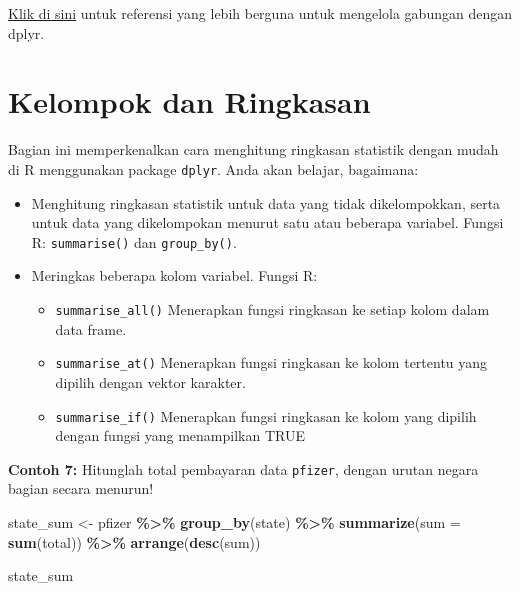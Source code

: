 \documentclass[
]{book}
\newenvironment{Shaded}{\begin{snugshade}}{\end{snugshade}}
\newcommand{\AttributeTok}[1]{\textcolor[rgb]{0.13,0.29,0.53}{#1}}
\newcommand{\FunctionTok}[1]{\textcolor[rgb]{0.13,0.29,0.53}{\textbf{#1}}}
\newcommand{\NormalTok}[1]{#1}
\newcommand{\OtherTok}[1]{\textcolor[rgb]{0.56,0.35,0.01}{#1}}
\newcommand{\SpecialCharTok}[1]{\textcolor[rgb]{0.81,0.36,0.00}{\textbf{#1}}}
\providecommand{\tightlist}{%
  \setlength{\itemsep}{0pt}\setlength{\parskip}{0pt}}
\begin{document}
\href{https://www.guru99.com/r-dplyr-tutorial.html}{Klik di sini} untuk referensi yang lebih berguna untuk mengelola gabungan dengan dplyr.

\hypertarget{kelompok-dan-ringkasan}{%
\section{Kelompok dan Ringkasan}\label{kelompok-dan-ringkasan}}

Bagian ini memperkenalkan cara menghitung ringkasan statistik dengan mudah di R menggunakan package \texttt{dplyr}. Anda akan belajar, bagaimana:

\begin{itemize}
\tightlist
\item
  Menghitung ringkasan statistik untuk data yang tidak dikelompokkan, serta untuk data yang dikelompokan menurut satu atau beberapa variabel. Fungsi R: \texttt{summarise()} dan \texttt{group\_by()}.
\item
  Meringkas beberapa kolom variabel. Fungsi R:

  \begin{itemize}
  \tightlist
  \item
    \texttt{summarise\_all()} Menerapkan fungsi ringkasan ke setiap kolom dalam data frame.
  \item
    \texttt{summarise\_at()} Menerapkan fungsi ringkasan ke kolom tertentu yang dipilih dengan vektor karakter.
  \item
    \texttt{summarise\_if()} Menerapkan fungsi ringkasan ke kolom yang dipilih dengan fungsi yang menampilkan TRUE
  \end{itemize}
\end{itemize}

\textbf{Contoh 7:} Hitunglah total pembayaran data \texttt{pfizer}, dengan urutan negara bagian secara menurun!

\begin{Shaded}
\begin{Highlighting}[]
\NormalTok{state\_sum }\OtherTok{\textless{}{-}}\NormalTok{ pfizer }\SpecialCharTok{\%\textgreater{}\%}
  \FunctionTok{group\_by}\NormalTok{(state) }\SpecialCharTok{\%\textgreater{}\%}
  \FunctionTok{summarize}\NormalTok{(}\AttributeTok{sum =} \FunctionTok{sum}\NormalTok{(total)) }\SpecialCharTok{\%\textgreater{}\%}
  \FunctionTok{arrange}\NormalTok{(}\FunctionTok{desc}\NormalTok{(sum))}

\NormalTok{state\_sum}
\end{Highlighting}
\end{Shaded}
\end{document}
